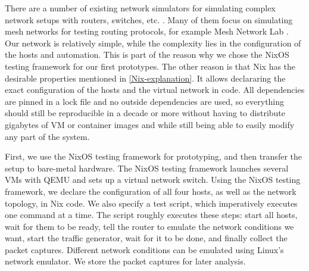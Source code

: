 There are a number of existing network simulators for simulating complex network setups with routers, switches, etc. \cite{network-simulators-list}.
Many of them focus on simulating mesh networks for testing routing protocols, for example Mesh Network Lab \cite{meshnet-lab}.
Our network is relatively simple, while the complexity lies in the configuration of the hosts and automation.
This is part of the reason why we chose the NixOS testing framework for our first prototypes.
The other reason is that Nix has the desirable properties mentioned in \cref{Nix-explanation}.
It allows declararing the exact configuration of the hosts and the virtual network in code.
All dependencies are pinned in a lock file and no outside dependencies are used, so everything should still be reproducible in a decade or more without having to distribute gigabytes of VM or container images and while still being able to easily modify any part of the system.

First, we use the NixOS testing framework for prototyping, and then transfer the setup to bare-metal hardware.
The NixOS testing framework launches several VMs with QEMU and sets up a virtual network switch.
Using the NixOS testing framework, we declare the configuration of all four hosts, as well as the network topology, in Nix code.
We also specify a test script, which imperatively executes one command at a time.
The script roughly executes these steps: start all hosts, wait for them to be ready, tell the router to emulate the network conditions we want, start the traffic generator, wait for it to be done, and finally collect the packet captures.
Different network conditions can be emulated using Linux's network emulator\cite{man8:tc-netem}.
We store the packet captures for later analysis.

